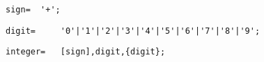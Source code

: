 \documentclass{article}
\begin{document}
    \begin{flushleft}
    \begin{lstlisting}[mathescape=true, breaklines=true]
     sign= 	'+';
    \end{lstlisting}
    \end{flushleft}
    \begin{flushleft}
    \begin{lstlisting}[mathescape=true, breaklines=true]
     digit= 	'0'|'1'|'2'|'3'|'4'|'5'|'6'|'7'|'8'|'9';
    \end{lstlisting}
    \end{flushleft}
    \begin{flushleft}
    \begin{lstlisting}[mathescape=true, breaklines=true]
     integer= 	[sign],digit,{digit};
    \end{lstlisting}
    \end{flushleft}
\end{document}
